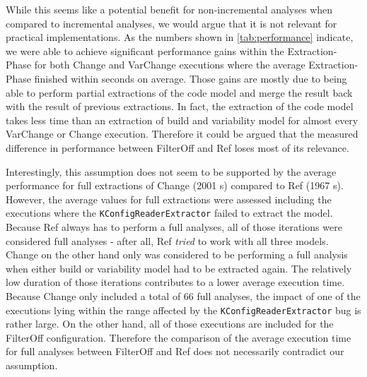 \documentclass[a4paper]{article}
\begin{document}
While this seems like a potential benefit for non-incremental analyses when compared to incremental analyses, we would argue that it is not relevant for practical implementations. As the numbers shown in \autoref{tab:performance} indicate, we were able to achieve significant performance gains within the Extraction-Phase for both Change and VarChange executions where the average Extraction-Phase finished within seconds on average. Those gains are mostly due to being able to perform partial extractions of the code model and merge the result back with the result of previous extractions. In fact, the extraction of the code model takes less time than an extraction of build and variability model for almost every VarChange or Change execution. Therefore it could be argued that the measured difference in performance between FilterOff and Ref loses most of its relevance. 

Interestingly, this assumption does not seem to be supported by the average performance for full extractions of Change (2001 s) compared to Ref (1967 s). However, the average values for full extractions were assessed including the executions where the \texttt{KConfig\-Reader\-Extractor} failed to extract the model. Because Ref always has to perform a full analyses, all of those iterations were considered full analyses - after all, Ref \emph{tried} to work with all three models. Change on the other hand only was considered to be performing a full analysis when either build or variability model had to be extracted again. The relatively low duration of those iterations contributes to a lower average execution time. Because Change only included a total of 66 full analyses, the impact of one of the executions lying within the range affected by the \texttt{KConfig\-Reader\-Extractor} bug is rather large. On the other hand, all of those executions are included for the FilterOff configuration. Therefore the comparison of the average execution time for full analyses between FilterOff and Ref does not necessarily contradict our assumption. 
\end{document}
